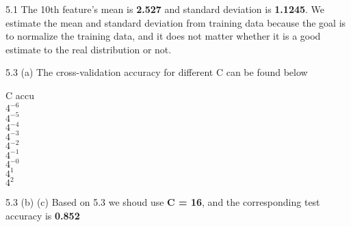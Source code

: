 \documentclass[12pt]{article}
\newenvironment{problem}[2][Problem]{\begin{trivlist}
\item[\hskip \labelsep {\bfseries #1}\hskip \labelsep {\bfseries #2}]}{\end{trivlist}}
\begin{document}
\begin{problem}{5. Programming}
\item{5.1}
The 10th feature's mean is \textbf{2.527} and standard deviation is \textbf{1.1245}. We estimate the mean and standard deviation from training data because the goal is to normalize the training data, and it does not matter whether it is a good estimate to the real distribution or not.
\item{5.3 (a)}
The cross-validation accuracy for different C can be found below
\begin{center}
	C     \:\: accu\\
	$4^{-6}$ \\
	$4^{-5}$ \\
	$4^{-4}$ \\
	$4^{-3}$ \\
	$4^{-2}$ \\
	$4^{-1}$ \\
	$4^{-0}$ \\
	$4^1$ \:\:\\
	$4^2$ \:\:\\
\end{center}
\item{5.3 (b) (c)}
Based on 5.3 we shoud use \textbf{C = 16}, and the corresponding test accuracy is \textbf{0.852}
\end{problem}
 
\end{document}
